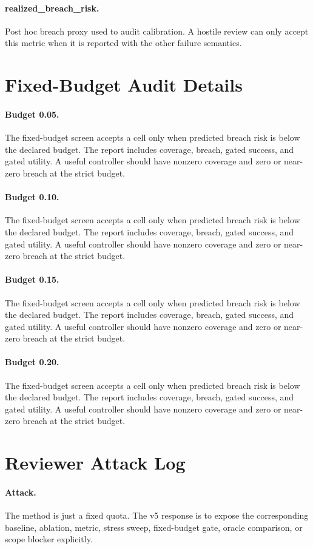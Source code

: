 \documentclass{article}
\begin{document}
\paragraph{realized\_breach\_risk.} Post hoc breach proxy used to audit calibration. A hostile review can only accept this metric when it is reported with the other failure semantics.
\clearpage
\section{Fixed-Budget Audit Details}
\paragraph{Budget 0.05.} The fixed-budget screen accepts a cell only when predicted breach risk is below the declared budget. The report includes coverage, breach, gated success, and gated utility. A useful controller should have nonzero coverage and zero or near-zero breach at the strict budget.
\paragraph{Budget 0.10.} The fixed-budget screen accepts a cell only when predicted breach risk is below the declared budget. The report includes coverage, breach, gated success, and gated utility. A useful controller should have nonzero coverage and zero or near-zero breach at the strict budget.
\paragraph{Budget 0.15.} The fixed-budget screen accepts a cell only when predicted breach risk is below the declared budget. The report includes coverage, breach, gated success, and gated utility. A useful controller should have nonzero coverage and zero or near-zero breach at the strict budget.
\paragraph{Budget 0.20.} The fixed-budget screen accepts a cell only when predicted breach risk is below the declared budget. The report includes coverage, breach, gated success, and gated utility. A useful controller should have nonzero coverage and zero or near-zero breach at the strict budget.
\clearpage
\section{Reviewer Attack Log}
\paragraph{Attack.} The method is just a fixed quota. The v5 response is to expose the corresponding baseline, ablation, metric, stress sweep, fixed-budget gate, oracle comparison, or scope blocker explicitly.
\end{document}
